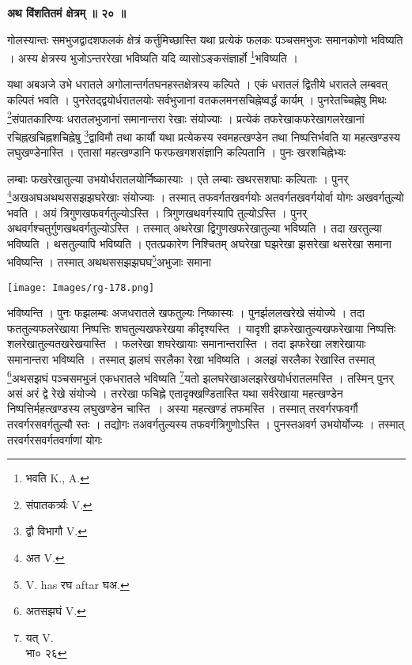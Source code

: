 \documentclass[11pt, openany]{book}
\begin{document}
\begin{center}
\textbf{\large अथ विंशतितमं क्षेत्रम् ॥ २० ॥ }
\end{center}
\vspace{5mm}

{\ab गोलस्यान्तः समभुजद्वादशफलकं क्षेत्रं कर्त्तुमिच्छास्ति यथा प्रत्येकं फलकः पञ्चसमभुजः समानकोणो भविष्यति । अस्य क्षेत्रस्य भुजोऽन्तररेखा भविष्यति यदि व्यासोऽङ्कसंज्ञार्हो \renewcommand{\thefootnote}{१}\footnote{भवति {\en K., A.}}भविष्यति । }\\
\vspace{5mm}

यथा अबअजे उभे धरातले अगोलान्तर्गतघनहस्तक्षेत्रस्य कल्पिते । एकं धरातलं द्वितीये धरातले लम्बवत् कल्पितं भवति । पुनरेतद्द्वयोर्धरातलयोः सर्वभुजानां वतकलमनसचिह्नेष्वर्द्धं कार्यम् । पुनरेतच्चिह्नेषु मिथः \renewcommand{\thefootnote}{२}\footnote{संपातकर्त्र्यः {\en V.}}संपातकारिण्यः धरातलभुजानां समानान्तरा रेखाः संयोज्याः । प्रत्येकं तफरेखाकफरेखागलरेखानां रचिह्नखचिह्नशचिह्नेषु \renewcommand{\thefootnote}{३}\footnote{द्वौ विभागौ {\en V.}}द्वाविमौ तथा कार्यौ यथा प्रत्येकस्य स्वमहत्खण्डेन तथा निष्पत्तिर्भवति या महत्खण्डस्य लघुखण्डेनास्ति । एतासां महत्खण्डानि फरफखगशसंज्ञानि कल्पितानि । पुनः खरशचिह्नेभ्यः

\newpage

लम्बाः फखरेखातुल्या उभयोर्धरातलयोर्निष्कास्याः । एते लम्बाः खथरसशघाः 
कल्पिताः । पुनर् \renewcommand{\thefootnote}{१}\footnote{अत {\en V.}}अखअघअथथससझझघरेखाः संयोज्याः । तस्मात् तफवर्गतखवर्गयोः अतवर्गतखवर्गयोर्वा योगः अखवर्गतुल्यो भवति । अयं त्रिगुणखफवर्गतुल्योऽस्ति । त्रिगुणखथवर्गस्यापि तुल्योऽस्ति । पुनर् अथवर्गश्चतुर्गुणखथवर्गतुल्योऽस्ति । तस्मात् अथरेखा द्विगुणखफरेखातुल्या भविष्यति । तदा खरतुल्या भविष्यति । थसतुल्यापि भविष्यति । एतत्प्रकारेण निश्चितम् अघरेखा घझरेखा झसरेखा
थसरेखा समाना भविष्यन्ति । तस्मात् अथथससझझघघ\renewcommand{\thefootnote}{२}\footnote{{\en V. has} रघ {\en aftar} घअ.}अभुजाः समाना 
\begin{center}
\texttt{[image: Images/rg-178.png]}  
\end{center} 
भविष्यन्ति । पुनः फझलम्बः अजधरातले खफतुल्यः निष्कास्यः । पुनर्झललखरेखे संयोज्ये । तदा फततुल्यफलरेखाया निष्पत्तिः शघतुल्यखफरेखया कीदृश्यस्ति~। यादृशी झफरेखातुल्यखफरेखाया निष्पत्तिः शलरेखातुल्यतखरेखयास्ति~। फलरेखा शघरेखायाः समानान्तरास्ति । तदा झफरेखा लशरेखायाः समानान्तरा भविष्यति । तस्मात् झलघं सरलैका रेखा भविष्यति । अलझं सरलैका रेखास्ति तस्मात् \renewcommand{\thefootnote}{३}\footnote{अतसझघं {\en V.}}अथसझघं पञ्चसमभुजं एकधरातले
भविष्यति \renewcommand{\thefootnote}{४}\footnote{ यत् {\en V.}\\
भा० २६}यतो झलघरेखाअलझरेखयोर्धरातलमस्ति । तस्मिन् पुनर् असं अरं द्वे रेखे संयोज्ये । तररेखा फचिह्ने एतादृक्खण्डितास्ति यथा सर्वरेखाया महत्खण्डेन निष्पत्तिर्महत्खण्डस्य लघुखण्डेन चास्ति~। अस्या महत्खण्डं तफमस्ति । तस्मात् तरवर्गरफवर्गौ तरवर्गरसवर्गतुल्यौ स्तः । तद्योगः तअवर्गतुल्यस्य तफवर्गत्रिगुणोऽस्ति । पुनस्तअवर्ग उभयोर्योज्यः । तस्मात् तरवर्गरसवर्गतवर्गाणां योगः
\end{document}
